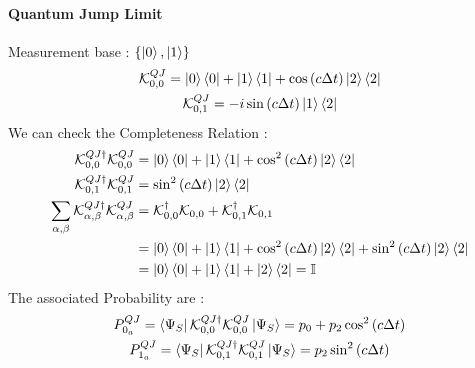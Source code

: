 \documentclass[a4paper,12pt]{article}
\begin{document}
	\paragraph{Quantum Jump Limit}
	Measurement base : $ \{ \ket{0}, \ket{1} \} $
	\begin{gather}
		\mathcal{K}_{0,0}^{QJ} = \ket{0}\bra{0} + \ket{1}\bra{1} + \cos \left( c \Delta t \right) \ket{2}\bra{2} \\
		\mathcal{K}_{0,1}^{QJ} = -i \sin \left( c \Delta t \right) \ket{1}\bra{2}
	\end{gather}
	We can check the Completeness Relation : 
	\begin{align}
		\mathcal{K}_{0,0}^{QJ \dagger} \mathcal{K}_{0,0}^{QJ} &= \ket{0}\bra{0} + \ket{1}\bra{1} + \cos^{2} \left( c \Delta t \right) \ket{2}\bra{2} \notag \\
		\mathcal{K}_{0,1}^{QJ \dagger} \mathcal{K}_{0,1}^{QJ} &= \sin^{2} \left( c \Delta t \right) \ket{2}\bra{2} \notag \\
		\sum_{\alpha, \beta} \mathcal{K}_{\alpha, \beta}^{QJ \dagger} \mathcal{K}_{\alpha, \beta}^{QJ} &= \mathcal{K}_{0,0}^{\dagger} \mathcal{K}_{0,0} + \mathcal{K}_{0,1}^{\dagger} \mathcal{K}_{0,1} \notag \\ 
		&= \ket{0}\bra{0} + \ket{1}\bra{1} + \cos^{2} \left( c \Delta t \right) \ket{2}\bra{2} + \sin^{2} \left( c \Delta t \right) \ket{2}\bra{2} \notag \\
		&= \ket{0}\bra{0} + \ket{1}\bra{1} + \ket{2}\bra{2} = \mathbb{I}
	\end{align}
	The associated Probability are :
	\begin{gather}
		P_{0_{a}}^{QJ} = \bra{\Psi_{S}}\mathcal{K}_{0,0}^{QJ \dagger} \mathcal{K}_{0,0}^{QJ}\ket{\Psi_{S}} = p_{0} + p_{2} \cos^{2} \left( c \Delta t \right) \\
		P_{1_{a}}^{QJ} = \bra{\Psi_{S}}\mathcal{K}_{0,1}^{QJ \dagger} \mathcal{K}_{0,1}^{QJ}\ket{\Psi_{S}} = p_{2} \sin^{2} \left( c \Delta t \right) 
	\end{gather}
	
\end{document}
